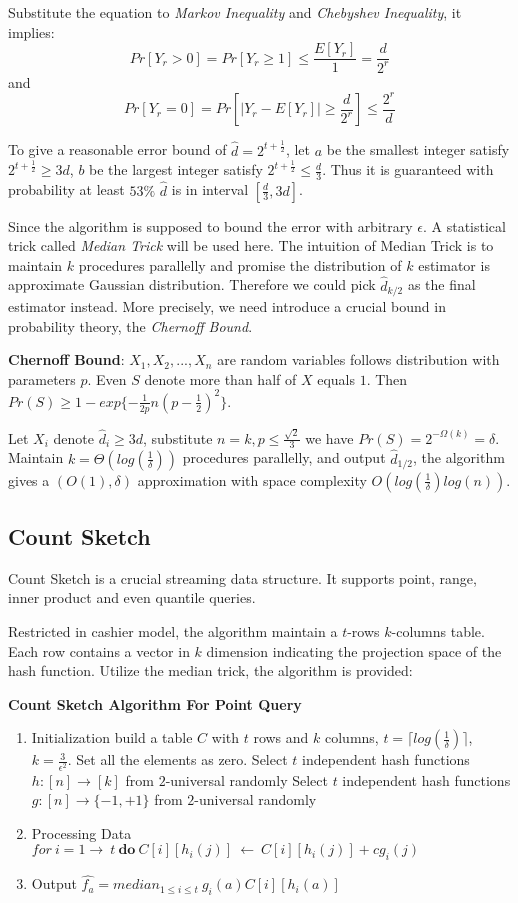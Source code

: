 \documentclass[CJK, a4paper]{cctart}
\begin{document}
Substitute the equation to \emph{Markov Inequality} and \emph{Chebyshev Inequality}, it implies:
$$Pr[Y_r > 0] = Pr[Y_r \ge 1] \le \frac{E[Y_r]}{1} = \frac{d}{2^r}$$
and
$$Pr[Y_r = 0] = Pr[|Y_r - E[Y_r]| \ge \frac{d}{2^r}] \le \frac{2^r}{d}$$

To give a reasonable error bound of $\hat{d} = 2^{t + \frac{1}{2}}$, let $a$ be the smallest integer satisfy $2^{t + \frac{1}{2}} \ge 3d$, $b$ be the largest integer satisfy $2^{t + \frac{1}{2}} \le \frac{d}{3}$. Thus it is guaranteed with probability at least $53\%$ $\hat{d}$ is in interval $[\frac{d}{3}, 3d]$.

Since the algorithm is supposed to bound the error with arbitrary $\epsilon$. A statistical trick called \emph{Median Trick} will be used here. The intuition of Median Trick is to maintain $k$ procedures parallelly and promise the distribution of $k$ estimator is approximate Gaussian distribution. Therefore we could pick $\hat{d}_{k/2}$ as the final estimator instead. More precisely, we need introduce a crucial bound in probability theory, the \emph{Chernoff Bound}.

\textbf{Chernoff Bound}: $X_1, X_2, ..., X_n$ are random variables follows distribution with parameters $p$. Even $S$ denote more than half of $X$ equals $1$. Then $Pr(S) \ge 1 - exp\{-\frac{1}{2p}n(p-\frac{1}{2})^2\}$.

Let $X_i$ denote $\hat{d}_i \ge 3d$, substitute $n = k, p \le \frac{\sqrt{2}}{3} $ we have $Pr(S) = 2^{-\Omega(k)} = \delta $. Maintain $k = \Theta(log(\frac{1}{\delta})) $ procedures parallelly, and output $\hat{d}_{1/2}$, the algorithm gives a $(O(1), \delta) $ approximation with space complexity $O(log(\frac{1}{\delta})log(n))$. 

\subsection{Count Sketch}
Count Sketch is a crucial streaming data structure. It supports point, range, inner product and even quantile queries.

Restricted in cashier model, the algorithm maintain a $t$-rows $k$-columns table. Each row contains a vector in $k$ dimension indicating the projection space of the hash function. Utilize the median trick, the algorithm is provided:

\textbf{Count Sketch Algorithm For Point Query}
\begin{enumerate}
\item Initialization
\subitem build a table $C$ with $t$ rows and $k$ columns, $t = \lceil log(\frac{1}{\delta}) \rceil$, $k = \frac{3}{\epsilon^2} $. Set all the elements as zero.
\subitem Select $t$ independent hash functions $h : [n] \rightarrow [k]$ from $2$-universal randomly
\subitem Select $t$ independent hash functions $g : [n] \rightarrow \{-1, +1\}$ from $2$-universal randomly
\item Processing Data
\subitem $for \ i = 1 \rightarrow \ t \ \mathbf{do} \ C[i][h_i(j)] \ \leftarrow \ C[i][h_i(j)] + cg_i(j) $
\item Output
\subitem $\hat{f_a} = median_{1 \le i \le t} \ g_i(a)C[i][h_i(a)] $
\end{enumerate}
\end{document}
